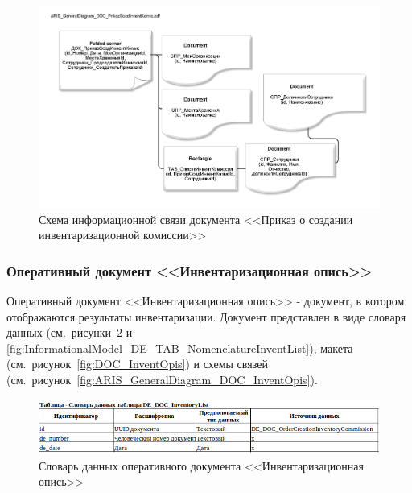 \begin{figure}[!h]
    \centering
    \includegraphics[width=14cm]
        {assets/ARIS/ARIS_GeneralDiagram_DOC_PrikazSozdInventKomis.adf.pdf}
    \caption{Схема информационной связи документа <<Приказ о создании инвентаризационной комиссии>>}
    \label{fig:ARIS_GeneralDiagram_DOC_PrikazSozdInventKomis}
\end{figure}

\newpage

\subsubsection{Оперативный документ <<Инвентаризационная опись>>}

Оперативный документ <<Инвентаризационная опись>>
- документ, в котором отображаются результаты инвентаризации.
Документ представлен в виде словаря данных (см.~рисунки~\ref{fig:InformationalModel_DE_DOC_InventoryList} и \ref{fig:InformationalModel_DE_TAB_NomenclatureInventList}),
макета (см.~рисунок~\ref{fig:DOC_InventOpis})
и схемы связей (см.~рисунок~\ref{fig:ARIS_GeneralDiagram_DOC_InventOpis}).

\begin{figure}[!h]
    \centering
    \includegraphics[width=16cm]
    {assets/InformationalModel/DE_DOC_InventoryList.png}
    \caption{Словарь данных оперативного документа <<Инвентаризационная опись>>}
    \label{fig:InformationalModel_DE_DOC_InventoryList}
\end{figure}

